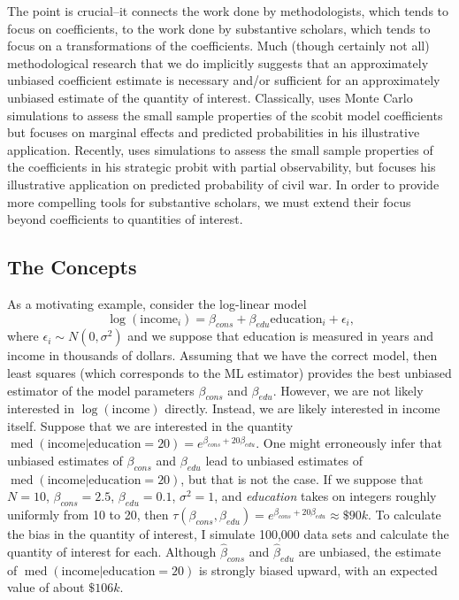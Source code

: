 \documentclass[12pt]{article}
\DeclareMathOperator{\med}{med}
\begin{document}
The point is crucial--it connects the work done by methodologists, which tends to focus on coefficients, to the work done by substantive scholars, which tends to focus on a transformations of the coefficients. Much (though certainly not all) methodological research that we do implicitly suggests that an approximately unbiased coefficient estimate is necessary and/or sufficient for an approximately unbiased estimate of the quantity of interest. Classically, \cite{Nagler1994} uses Monte Carlo simulations to assess the small sample properties of the scobit model coefficients but focuses on marginal effects and predicted probabilities in his illustrative application. Recently, \cite{Nieman2015} uses simulations to assess the small sample properties of the coefficients in his strategic probit with partial observability, but focuses his illustrative application on predicted probability of civil war. In order to provide more compelling tools for substantive scholars, we must extend their focus beyond coefficients to quantities of interest.

\subsection*{The Concepts}

As a motivating example, consider the log-linear model 
\begin{equation}
\log (\text{income}_i) = \beta_{cons} + \beta_{edu} \text{education}_i + \epsilon_i \text{,}\nonumber
\end{equation}
where $\epsilon_i \sim N(0, \sigma^2)$ and we suppose that education is measured in years and income in thousands of dollars. Assuming that we have the correct model, then least squares (which corresponds to the ML estimator) provides the best unbiased estimator of the model parameters $\beta_{cons}$ and $\beta_{edu}$. However, we are not likely interested in $\log(\text{income})$ directly. Instead, we are likely interested in income itself. Suppose that we are interested in the quantity $\med(\text{income} | \text{education} = 20) = e^{\beta_{cons} + 20\beta_{edu}}$. One might erroneously infer that unbiased estimates of $\beta_{cons}$ and $\beta_{edu}$ lead to unbiased estimates of $\med(\text{income} | \text{education} = 20)$, but that is not the case. If we suppose that $N = 10$, $\beta_{cons} = 2.5$, $\beta_{edu} = 0.1$, $\sigma^2 = 1$, and \textit{education} takes on integers roughly uniformly from 10 to 20, then $\tau(\beta_{cons}, \beta_{edu}) = e^{\beta_{cons} + 20\beta_{edu}} \approx \$90k$. To calculate the bias in the quantity of interest, I simulate 100,000 data sets and calculate the quantity of interest for each. Although $\hat{\beta}_{cons}$ and $\hat{\beta}_{edu}$ are unbiased, the estimate of $\med(\text{income} | \text{education} = 20)$ is strongly biased upward, with an expected value of about $\$106k$.
\end{document}
